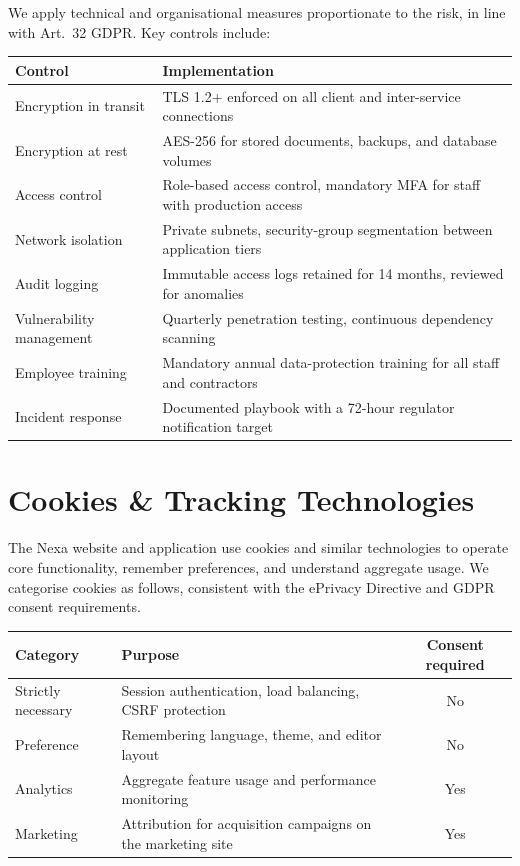 \documentclass[11pt,a4paper]{scrartcl}
\begin{document}
We apply technical and organisational measures proportionate to the risk, in line with Art.\ 32
GDPR. Key controls include:

\begin{tabularx}{\linewidth}{@{}l Y@{}}
\toprule
\textbf{Control} & \textbf{Implementation} \\
\midrule
Encryption in transit & TLS 1.2+ enforced on all client and inter-service connections \\
Encryption at rest & AES-256 for stored documents, backups, and database volumes \\
Access control & Role-based access control, mandatory MFA for staff with production access \\
Network isolation & Private subnets, security-group segmentation between application tiers \\
Audit logging & Immutable access logs retained for 14 months, reviewed for anomalies \\
Vulnerability management & Quarterly penetration testing, continuous dependency scanning \\
Employee training & Mandatory annual data-protection training for all staff and contractors \\
Incident response & Documented playbook with a 72-hour regulator notification target \\
\bottomrule
\end{tabularx}

\section{Cookies \& Tracking Technologies}
\label{sec:cookies}

The Nexa website and application use cookies and similar technologies to operate core
functionality, remember preferences, and understand aggregate usage. We categorise cookies as
follows, consistent with the ePrivacy Directive and GDPR consent requirements.

\begin{tabularx}{\linewidth}{@{}l Y c@{}}
\toprule
\textbf{Category} & \textbf{Purpose} & \textbf{Consent required} \\
\midrule
Strictly necessary & Session authentication, load balancing, CSRF protection & No \\
Preference & Remembering language, theme, and editor layout & No \\
Analytics & Aggregate feature usage and performance monitoring & Yes \\
Marketing & Attribution for acquisition campaigns on the marketing site & Yes \\
\bottomrule
\end{tabularx}
\end{document}
